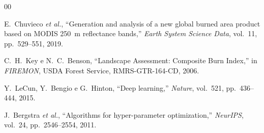 \documentclass[conference]{IEEEtran}
\begin{document}
\begin{thebibliography}{00}

E.~Chuvieco \textit{et al.},
``Generation and analysis of a new global burned area product based on
MODIS 250~m reflectance bands,''
\textit{Earth System Science Data}, vol.~11, pp.~529--551, 2019.

C.~H.~Key e N.~C.~Benson,
``Landscape Assessment: Composite Burn Index,''
in \textit{FIREMON}, USDA Forest Service, RMRS-GTR-164-CD, 2006.

Y.~LeCun, Y.~Bengio e G.~Hinton,
``Deep learning,''
\textit{Nature}, vol.~521, pp.~436--444, 2015.

J.~Bergstra \textit{et al.},
``Algorithms for hyper-parameter optimization,''
\textit{NeurIPS}, vol.~24, pp.~2546--2554, 2011.

\end{thebibliography}
\end{document}
